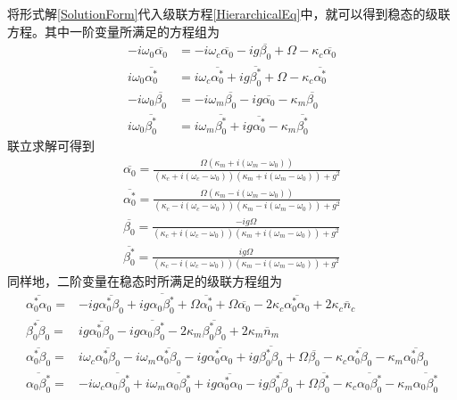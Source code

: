 将形式解\eqref{SolutionForm}代入级联方程\eqref{HierarchicalEq}中，就可以得到稳态的级联方程。其中一阶变量所满足的方程组为
\begin{equation}
\begin{aligned}
-i\omega_{0}\overline{\alpha_{0}}&=-i\omega_{c}\overline{\alpha_{0}}-ig\overline{\beta_{0}}+\Omega-\kappa_{c}\overline{\alpha_{0}} \\
i\omega_{0}\overline{\alpha^{*}_{0}}&=i\omega_{c}\overline{\alpha^{*}_{0}}+ig\overline{\beta^{*}_{0}}+\Omega-\kappa_{c}\overline{\alpha^{*}_{0}} \\
-i\omega_{0}\overline{\beta_{0}}&=-i\omega_{m}\overline{\beta_{0}}-ig\overline{\alpha_{0}}-\kappa_{m}\overline{\beta_{0}} \\
i\omega_{0}\overline{\beta^{*}_{0}}&=i\omega_{m}\overline{\beta^{*}_{0}}+ig\overline{\alpha^{*}_{0}}-\kappa_{m}\overline{\beta^{*}_{0}} \label{1odeqs}
\end{aligned}
\end{equation}
联立求解可得到
\begin{equation}
\begin{aligned}
\overline{\alpha_{0}} = \frac{\Omega(\kappa_{m}+i(\omega_{m}-\omega_{0}))}{(\kappa_{c}+i(\omega_{c}-\omega_{0}))(\kappa_{m}+i(\omega_{m}-\omega_{0}))+g^{2}} \\
\overline{\alpha^{*}_{0}} = \frac{\Omega(\kappa_{m}-i(\omega_{m}-\omega_{0}))}{(\kappa_{c}-i(\omega_{c}-\omega_{0}))(\kappa_{m}-i(\omega_{m}-\omega_{0}))+g^{2}} \\
\overline{\beta_{0}} = \frac{-ig\Omega}{(\kappa_{c}+i(\omega_{c}-\omega_{0}))(\kappa_{m}+i(\omega_{m}-\omega_{0}))+g^{2}} \\ 
\overline{\beta^{*}_{0}} = \frac{ig\Omega}{(\kappa_{c}-i(\omega_{c}-\omega_{0}))(\kappa_{m}-i(\omega_{m}-\omega_{0}))+g^{2}} 
\end{aligned}\label{first_order}
\end{equation}
同样地，二阶变量在稳态时所满足的级联方程组为
\begin{equation}
\begin{aligned}
{\overline{\alpha^{*}_0\alpha_0}}={}&-ig\overline{\alpha^{*}_0\beta_0}+ig\overline{\alpha_0\beta_0^{*}}+\Omega \overline{\alpha^{*}_0}+\Omega \overline{\alpha_0}-2\kappa_{c}\overline{\alpha^{*}_0\alpha_0}
+2\kappa_{c}\overline{n}_{c} \\
{\overline{\beta_0^{*}\beta_0}}={}&ig\overline{\alpha^{*}_0\beta_0} -ig\overline{\alpha_0\beta_0^{*}} -2\kappa_{m}\overline{\beta_0^{*}\beta_0}
+2\kappa_{m}\overline{n}_{m} \\
{\overline{\alpha^{*}_0\beta_0}}={}&i\omega_{c}\overline{\alpha^{*}_0\beta_0} -i\omega_{m}\overline{\alpha^{*}_0\beta_0} -ig\overline{\alpha^{*}_0\alpha_0}+ig\overline{\beta_0^{*}\beta_0}+\Omega \overline{\beta_0}-\kappa_{c}\overline{\alpha^{*}_0\beta_0}-\kappa_{m}\overline{\alpha^{*}_0\beta_0} \\
{\overline{\alpha_0\beta_0^{*}}}={}&-i\omega_{c}\overline{\alpha_0\beta_0^{*}}+i\omega_{m}\overline{\alpha_0\beta_0^{*}}
+ig\overline{\alpha^{*}_0\alpha_0}-ig\overline{\beta_0^{*}\beta_0}+\Omega \overline{\beta_0^{*}}-\kappa_{c}\overline{\alpha_0\beta_0^{*}}-\kappa_{m}\overline{\alpha_0\beta_0^{*}}
\end{aligned}\label{2odeqs}
\end{equation}
